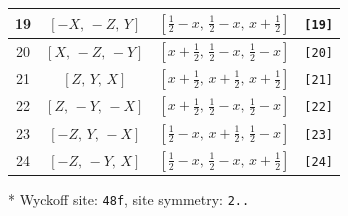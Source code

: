 \documentclass[fleqn,8pt]{jsarticle}
\begin{document}
\begin{longtable}{cccc}
19 & $\left[ - X,\, - Z,\, Y \right]$ & $\left[ \frac{1}{2} - x,\, \frac{1}{2} - x,\, x + \frac{1}{2} \right]$ & {\tt [19]} \\ \hline
20 & $\left[ X,\, - Z,\, - Y \right]$ & $\left[ x + \frac{1}{2},\, \frac{1}{2} - x,\, \frac{1}{2} - x \right]$ & {\tt [20]} \\ \hline
21 & $\left[ Z,\, Y,\, X \right]$ & $\left[ x + \frac{1}{2},\, x + \frac{1}{2},\, x + \frac{1}{2} \right]$ & {\tt [21]} \\ \hline
22 & $\left[ Z,\, - Y,\, - X \right]$ & $\left[ x + \frac{1}{2},\, \frac{1}{2} - x,\, \frac{1}{2} - x \right]$ & {\tt [22]} \\ \hline
23 & $\left[ - Z,\, Y,\, - X \right]$ & $\left[ \frac{1}{2} - x,\, x + \frac{1}{2},\, \frac{1}{2} - x \right]$ & {\tt [23]} \\ \hline
24 & $\left[ - Z,\, - Y,\, X \right]$ & $\left[ \frac{1}{2} - x,\, \frac{1}{2} - x,\, x + \frac{1}{2} \right]$ & {\tt [24]} \\
\end{longtable}
* Wyckoff site: {\tt 48f}, site symmetry: {\tt 2..}
\renewcommand{\arraystretch}{1.2}
\end{document}
